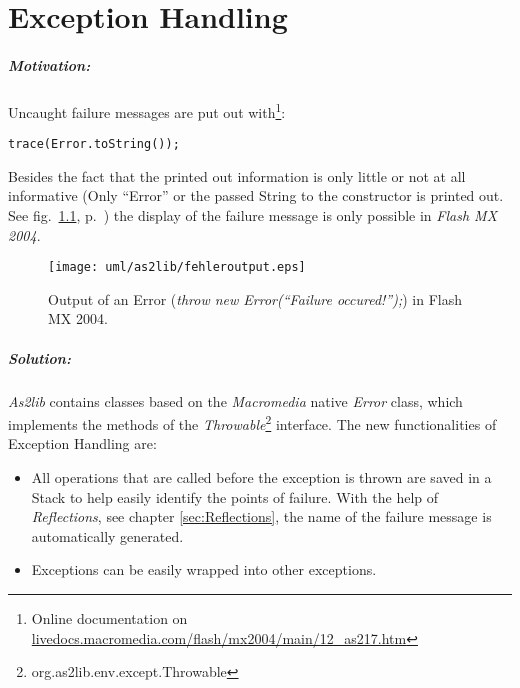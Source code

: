 \chapter{Exception Handling}
\label{sec:ExceptionHandling}

\paragraph{Motivation:}
Uncaught failure messages are put out with\footnote{Online documentation on \href{http://livedocs.macromedia.com/flash/mx2004/main/12_as217.htm}{livedocs.macromedia.com/flash/mx2004/main/12\_as217.htm}}:
\begin{lstlisting}[frame=single]
trace(Error.toString());
\end{lstlisting}
Besides the fact that the printed out information is only little or not at all informative (Only ``Error'' or the passed String to the constructor is printed out. See fig.\ \ref{fig:fehleroutput}, p.\ \pageref{fig:fehleroutput}) the display of the failure message is only possible in {\sl Flash MX 2004}.

\begin{figure}[!ht]
\begin{center}
\texttt{[image: uml/as2lib/fehleroutput.eps]}
\caption{Output of an Error (\emph{throw new Error(``Failure occured!'');}) in Flash MX 2004.}
\label{fig:fehleroutput}
\end{center}
\end{figure}

\paragraph{Solution:}
{\sl As2lib} contains classes based on the {\sl Macromedia} native {\sl Error} class, which implements the methods of the \emph{Throwable}\footnote{org.as2lib.env.except.Throwable} interface.
The new functionalities of Exception Handling are:

\begin{itemize}
	\item All operations that are called before the exception is thrown are saved in a Stack to help easily identify the points of failure. With the help of \emph{Reflections}, see chapter \ref{sec:Reflections}, the name of the failure message is automatically generated.
	\item Exceptions can be easily wrapped into other exceptions.
\end{itemize}

